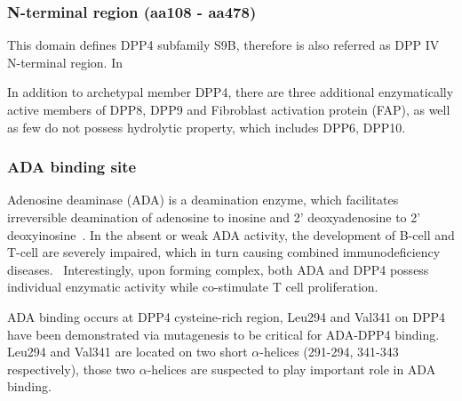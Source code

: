 \subsubsection{N-terminal region (aa108 - aa478)}

This domain defines DPP4 subfamily S9B, therefore is also referred as DPP IV N-terminal region. In 
\par 
In addition to archetypal member DPP4, there are three additional enzymatically active members of DPP8, DPP9 and Fibroblast activation protein (FAP), as well as few do not possess hydrolytic property, which includes DPP6, DPP10. 

\subsubsection{ADA binding site}
Adenosine deaminase (ADA) is a deamination enzyme, which facilitates irreversible deamination of adenosine to inosine and 2' deoxyadenosine to 2' deoxyinosine~\cite{Franco_1998}. In the absent or weak ADA activity, the development of B-cell and T-cell are severely impaired, which in turn causing combined immunodeficiency diseases.~\cite{Cristalli2001} Interestingly, upon forming complex, both ADA and DPP4 possess individual enzymatic activity while co-stimulate T cell proliferation.~\cite{De_Meester_1999}  
\par 
ADA binding occurs at DPP4 cysteine-rich region,
Leu294 and Val341 on DPP4 have been demonstrated via mutagenesis to be critical for ADA-DPP4 binding.~\cite{Abbott_1999} Leu294 and Val341 are located on two short $\alpha$-helices (291-294, 341-343 respectively), those two $\alpha$-helices are suspected to play important role in ADA binding. 